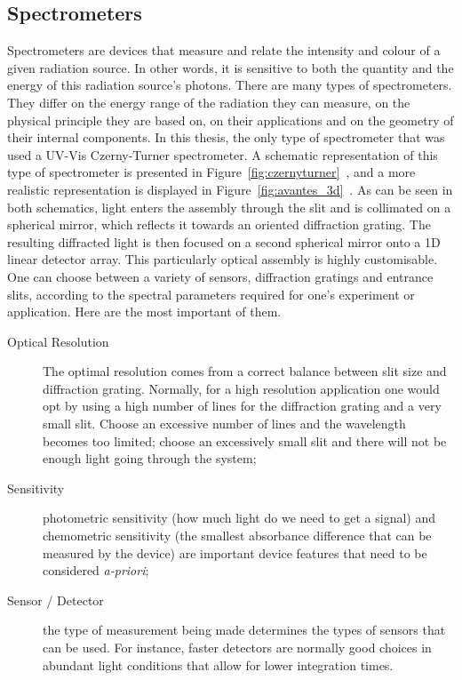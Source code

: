 \subsection{Spectrometers}%
\label{sub:theobg_opticalsystems_spectrometers}

Spectrometers are devices that measure and relate the intensity and
colour of a given radiation source. In other words, it is sensitive to
both the quantity and the energy of this radiation source's photons.
There are many types of spectrometers. They differ on the energy range
of the radiation they can measure, on the physical principle they are
based on, on their applications and on the geometry of their internal
components. In this thesis, the only type of spectrometer that was used
a UV-Vis Czerny-Turner spectrometer. A schematic representation of this
type of spectrometer is presented in
Figure~\ref{fig:czernyturner}~,
and a more realistic representation is displayed in
Figure~\ref{fig:avantes_3d}~. As can
be seen in both schematics, light enters the assembly through the slit
and is collimated on a spherical mirror, which reflects it towards an
oriented diffraction grating. The resulting diffracted light is then
focused on a second spherical mirror onto a 1D linear detector array.
This particularly optical assembly is highly customisable. One can
choose between a variety of sensors, diffraction gratings and entrance
slits, according to the spectral parameters required for one's
experiment or application. Here are the most important of them.

\begin{description}
    \item[Optical Resolution] The optimal resolution comes from a
        correct balance between slit size and diffraction grating.
        Normally, for a high resolution application one would opt by
        using a high number of lines for the diffraction grating and a
        very small slit. Choose an excessive number of lines and the
        wavelength becomes too limited; choose an excessively small slit
        and there will not be enough light going through the system;
    \item[Sensitivity] photometric sensitivity (how much light do we
        need to get a signal) and chemometric sensitivity (the smallest
        absorbance difference that can be measured by the device) are
        important device features that need to be considered
        \emph{a-priori};
    \item[Sensor / Detector] the type of measurement being made
        determines the types of sensors that can be used. For instance,
        faster detectors are normally good choices in abundant light
        conditions that allow for lower integration times.
\end{description}

